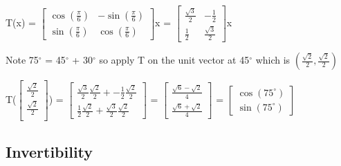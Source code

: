    \begin{tbox}
        T(x) =
        $\begin{bmatrix}
            \cos(\frac{\pi}{6}) & -\sin(\frac{\pi}{6}) \\
            \sin(\frac{\pi}{6}) & \cos(\frac{\pi}{6})
        \end{bmatrix}$x =
        $\begin{bmatrix}
            \frac{\sqrt{3}}{2} & -\frac{1}{2} \\
            \frac{1}{2} & \frac{\sqrt{3}}{2}
        \end{bmatrix}$x

        Note 75$^{\circ}$ = 45$^{\circ}$ + 30$^{\circ}$
        so apply T on the unit vector at 45$^{\circ}$
        which is $(\frac{\sqrt{2}}{2},\frac{\sqrt{2}}{2})$

        \hspace{0.5cm}
        T($\begin{bmatrix}
                \frac{\sqrt{2}}{2} \\
                \frac{\sqrt{2}}{2} \\
            \end{bmatrix}$)
        = $\begin{bmatrix}
            \frac{\sqrt{3}}{2}\frac{\sqrt{2}}{2} + -\frac{1}{2}\frac{\sqrt{2}}{2} \\
            \frac{1}{2}\frac{\sqrt{2}}{2} + \frac{\sqrt{3}}{2}\frac{\sqrt{2}}{2}
            \end{bmatrix}$
        = $\begin{bmatrix}
                \frac{\sqrt{6} - \sqrt{2}}{4} \\
                \frac{\sqrt{6} + \sqrt{2}}{4}
            \end{bmatrix}$
        = $\begin{bmatrix}
            \cos(75^{\circ}) \\
            \sin(75^{\circ})
        \end{bmatrix}$
    \end{tbox}

    \vspace{0.5cm}





\subsection{ Invertibility }

